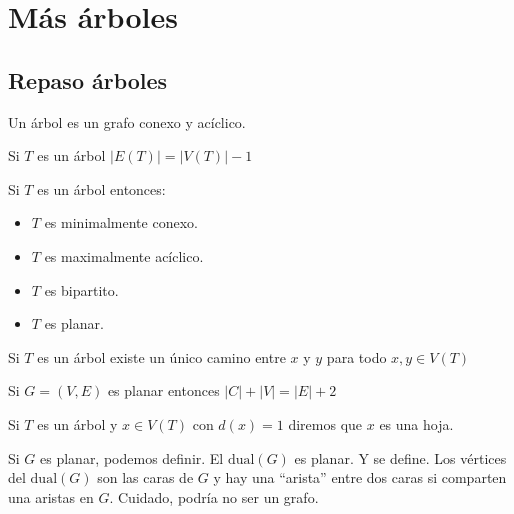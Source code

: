 \documentclass[../main.tex]{subfiles}
\begin{document}
\chapter{Más árboles}%

\thispagestyle{fancy}

\section{Repaso árboles}%
\label{sec:repaso_arboles}

Un árbol es un grafo conexo y acíclico.

\teorema
Si $T$ es un árbol $|E(T)|=|V(T)|-1$

\teorema
Si $T$ es un árbol entonces:
\begin{itemize}
	\item $T$ es minimalmente conexo.
	\item $T$ es maximalmente acíclico.
	\item $T$ es bipartito.
	\item $T$ es planar.
\end{itemize}

\teorema
Si $T$ es un árbol existe un único camino entre $x$ y $y$
para todo $x,y \in V(T)$

\teorema
Si $G=(V,E)$ es planar entonces $|C|+|V|=|E|+2$

\teorema
Si $T$ es un árbol y $x\in V(T)$ con $d(x)=1$ diremos que $x$ es una hoja.

\teorema
Si $G$ es planar, podemos definir.
El $\text{dual}(G)$ es planar.
Y se define.
\dobledef
{
	Los vértices del $\text{dual}(G)$ son las caras de $G$ y hay una ``arista''
	entre dos caras si comparten una aristas en $G$.
}
{
	Cuidado, podría no ser un grafo.
}

\begin{figure}[H]
	\centering
	
\end{figure}

\begin{figure}[H]
	\centering
	
\end{figure}

\begin{figure}[H]
	\centering
	
\end{figure}

\begin{figure}[H]
	\bfseries
	\boldmath
	\centering
	
\end{figure}
\end{document}
